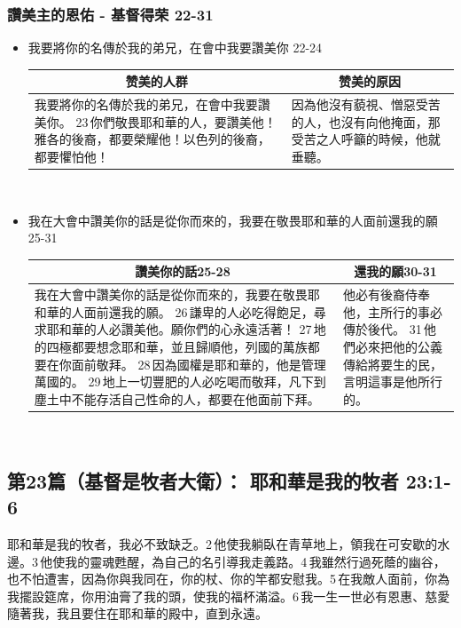 \subsubsection{讚美主的恩佑 - 基督得荣  22-31}
\begin{itemize}
\itemsep-.45em  
\item 我要將你的名傳於我的弟兄，在會中我要讚美你 22-24
\begin{table}[H]
\centering
\begin{tabular}{p{10.65cm}|p{7.25cm}}\hline\hline
\multicolumn{1}{c|}{赞美的人群}&\multicolumn{1}{c}{赞美的原因}\\\hline
我要將你的名傳於我的弟兄，在會中我要讚美你。
23 你們敬畏耶和華的人，要讚美他！雅各的後裔，都要榮耀他！以色列的後裔，都要懼怕他！
&因為他沒有藐視、憎惡受苦的人，也沒有向他掩面，那受苦之人呼籲的時候，他就垂聽。\\\hline
\end{tabular}
\end{table} 


\item 我在大會中讚美你的話是從你而來的，我要在敬畏耶和華的人面前還我的願 25-31
\begin{table}[H]
\centering
\begin{tabular}{p{13cm}|p{4.5cm}}\hline\hline
\multicolumn{1}{c|}{讚美你的話25-28}&\multicolumn{1}{c}{還我的願30-31}\\\hline
我在大會中讚美你的話是從你而來的，我要在敬畏耶和華的人面前還我的願。
26 謙卑的人必吃得飽足，尋求耶和華的人必讚美他。願你們的心永遠活著！
27 地的四極都要想念耶和華，並且歸順他，列國的萬族都要在你面前敬拜。
28 因為國權是耶和華的，他是管理萬國的。
29 地上一切豐肥的人必吃喝而敬拜，凡下到塵土中不能存活自己性命的人，都要在他面前下拜。
&他必有後裔侍奉他，主所行的事必傳於後代。
31 他們必來把他的公義傳給將要生的民，言明這事是他所行的。\\\hline
\end{tabular}
\end{table} 

\end{itemize}


\subsection{第23篇（基督是牧者大衛）：  耶和華是我的牧者 23:1-6}
耶和華是我的牧者，我必不致缺乏。2 他使我躺臥在青草地上，領我在可安歇的水邊。3 他使我的靈魂甦醒，為自己的名引導我走義路。4 我雖然行過死蔭的幽谷，也不怕遭害，因為你與我同在，你的杖、你的竿都安慰我。5 在我敵人面前，你為我擺設筵席，你用油膏了我的頭，使我的福杯滿溢。6 我一生一世必有恩惠、慈愛隨著我，我且要住在耶和華的殿中，直到永遠。


